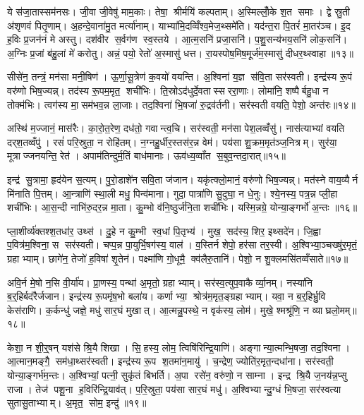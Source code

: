 ये स॑जा॒तास्सम॑नसः। जी॒वा जी॒वेषु॑ माम॒काः। तेषा॒ श्रीर्मयि॑ कल्पताम्। अ॒स्मिल्लोँ॒के श॒त समाः। द्वे स्रु॒ती अ॑शृणवं पितृ॒णाम्। अ॒हन्दे॒वाना॑मु॒त मर्त्या॑नाम्। याभ्या॑मि॒दव्विँश्व॒मेज॒थ्समे॑ति। यद॑न्त॒रा पि॒तरं॑ मा॒तर॑ञ्च। इ॒द ह॒विः प्र॒जन॑नं मे अस्तु। दश॑वीर स॒र्वग॑ण स्व॒स्तये। आ॒त्म॒सनि॑ प्रजा॒सनि॑। प॒शु॒सन्य॑भय॒सनि॑ लोक॒सनि॑। अ॒ग्निः प्र॒जां ब॑हु॒लां मे॑ करोतु। अन्नं॒ पयो॒ रेतो॑ अ॒स्मासु॑ धत्त। रा॒यस्पोष॒मिष॒मूर्ज॑म॒स्मासु॑ दीधर॒थ्स्वाहा॥१३॥\anuvakamend[इ॒न्द्रि॒याय॑ पि॒तर॑श्श॒तायु॑षा पु॒नन्तु॑ मा पिताम॒हाः पु॒नन्तु॒ प्रपि॑तामहाः कल्पता स्व॒स्तये॒ पञ्च॑ च]

सीसे॑न॒ तन्त्रं॒ मन॑सा मनी॒षिण॑। ऊ॒र्णा॒सू॒त्रेण॑ क॒वयो॑ वयन्ति। अ॒श्विना॑ य॒ज्ञ स॑वि॒ता सर॑स्वती। इन्द्र॑स्य रू॒पं वरु॑णो भिष॒ज्यन्न्। तद॑स्य रू॒पम॒मृत॒ शची॑भिः। ति॒स्रोऽद॑धुर्दे॒वतास्सररा॒णाः। लोमा॑नि॒ शष्पैर्बहु॒धा न तोक्म॑भिः। त्वग॑स्य मा॒सम॑भव॒न्न ला॒जाः। तद॒श्विना॑ भि॒षजा॑ रु॒द्रव॑र्तनी। सर॑स्वती वयति॒ पेशो॒ अन्त॑रः॥१४॥

अस्थि॑ म॒ज्जानं॒ मास॑रैः। का॒रो॒त॒रेण॒ दध॑तो॒ गवान्त्व॒चि। सर॑स्वती॒ मन॑सा पेश॒लव्वँसु॑। नास॑त्याभ्यां वयति दर्‌श॒तव्वँपु॑। रसं॑ परि॒स्रुता॒ न रोहि॑तम्। न॒ग्नहु॒र्धीर॒स्तस॑र॒न्न वेम॑। पय॑सा शु॒क्रम॒मृत॑ञ्ज॒नित्रम्। सुर॑या॒ मूत्राज्जनयन्ति॒ रेत॑। अपाम॑तिन्दुर्म॒तिं बाध॑मानाः। ऊव॑ध्य॒व्वाँत स॒बुव॒न्तदा॒रात्॥१५॥

इन्द्र॑ सु॒त्रामा॒ हृद॑येन स॒त्यम्। पु॒रो॒डाशे॑न सवि॒ता ज॑जान। यकृ॑त्क्लो॒मानं॒ वरु॑णो भिष॒ज्यन्न्। मत॑स्ने वाय॒व्यैर्न मि॑नाति पि॒त्तम्। आ॒न्त्राणि॑ स्था॒ली मधु॒ पिन्व॑माना। गुदा॒ पात्रा॑णि सु॒दुघा॒ न धे॒नुः। श्ये॒नस्य॒ पत्र॒न्न प्ली॒हा शची॑भिः। आ॒स॒न्दी नाभि॑रु॒दर॒न्न मा॒ता। कु॒म्भो व॑नि॒ष्ठुर्ज॑नि॒ता शची॑भिः। यस्मि॒न्नग्रे॒ योन्या॒ङ्गर्भो॑ अ॒न्तः ॥१६॥

प्ला॒शीर्व्य॑क्तश्श॒तधा॑र॒ उथ्स॑। दु॒हे न कु॒म्भी स्व॒धां पि॒तृभ्य॑। मुख॒ सद॑स्य॒ शिर॒ इथ्सदे॑न। जि॒ह्वा प॒वित्र॑म॒श्विना॒ स सर॑स्वती। चप्प॒न्न पा॒युर्भि॒षग॑स्य॒ वाल॑। व॒स्तिर्न शेपो॒ हर॑सा तर॒स्वी। अ॒श्विभ्या॒ञ्चख्षु॑र॒मृतं॒ ग्रहाभ्याम्। छागे॑न॒ तेजो॑ ह॒विषा॑ शृ॒तेन॑। पक्ष्मा॑णि गो॒धूमै॒ क्व॑लैरु॒तानि॑। पेशो॒ न शु॒क्लमसि॑तव्वँसाते॥१७॥

अवि॒र्न मे॒षो न॒सि वी॒र्या॑य। प्रा॒णस्य॒ पन्था॑ अ॒मृतो॒ ग्रहाभ्याम्। सर॑स्व॒त्युप॒वाकैर्व्या॒नम्। नस्या॑नि ब॒र्॒हिर्बद॑रैर्जजान। इन्द्र॑स्य रू॒पमृ॑ष॒भो बला॑य। कर्णाभ्या॒ श्रोत्र॑म॒मृत॒ङ्ग्रहाभ्याम्। यवा॒ न ब॒र्॒हिर्भ्रु॒वि केस॑राणि। क॒र्कन्धु॑ जज्ञे॒ मधु॑ सार॒घं मुखात्। आ॒त्मन्नु॒पस्थे॒ न वृक॑स्य॒ लोम॑। मुखे॒ श्मश्रू॑णि॒ न व्याघ्रलो॒मम्॥१८॥

केशा॒ न शी॒र्॒षन्‌ यश॑से श्रि॒यै शिखा। सि॒हस्य॒ लोम॒ त्विषि॑रिन्द्रि॒याणि॑। अङ्गान्या॒त्मन्भि॒षजा॒ तद॒श्विना। आ॒त्मान॒मङ्गै॒ सम॑धा॒थ्सर॑स्वती। इन्द्र॑स्य रू॒प श॒तमा॑न॒मायु॑। च॒न्द्रेण॒ ज्योति॑र॒मृत॒न्दधा॑ना। सर॑स्वती॒ योन्या॒ङ्गर्भ॑म॒न्तः। अ॒श्विभ्यां॒ पत्नी॒ सुकृ॑तं बिभर्ति। अ॒पा रसे॑न॒ वरु॑णो॒ न साम्ना। इन्द्र श्रि॒यै ज॒नय॑न्न॒प्सु राजा। तेज॑ पशू॒ना ह॒विरि॑न्द्रि॒याव॑त्। प॒रि॒स्रुता॒ पय॑सा सार॒घं मधु॑। अ॒श्विभ्यान्दु॒ग्धं भि॒षजा॒ सर॑स्वत्या सुतासु॒ताभ्याम्। अ॒मृत॒ सोम॒ इन्दु॑॥१९॥\anuvakamend[अन्त॑र आ॒राद॒न्तर्व॑साते व्याघ्रलो॒म राजा॑ च॒त्वारि॑ च]

